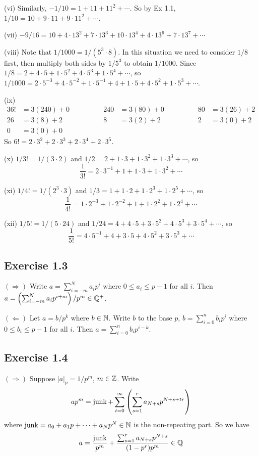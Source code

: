 \documentclass[../Koblitz.tex]{subfiles}
\begin{document}
(vi) Similarly, $-1/10=1+11+11^2+\cdots$. So by Ex 1.1, $1/10=10+9\cdot11+9\cdot11^2+\cdots$.

(vii) $-9/16=10+4\cdot13^2+7\cdot13^3+10\cdot13^4+4\cdot13^6+7\cdot13^7+\cdots$

(viii) Note that $1/1000=1/(5^3\cdot8)$. In this situation we need to consider $1/8$ first, then multiply both sides by $1/5^3$ to obtain $1/1000$. Since $1/8=2+4\cdot5+1\cdot5^2+4\cdot5^3+1\cdot5^4+\cdots$, so $1/1000=2\cdot5^{-3}+4\cdot5^{-2}+1\cdot5^{-1}+4+1\cdot5+4\cdot5^2+1\cdot5^3+\cdots$.

(ix) \begin{alignat*}{3}
6!&=3(240)+0 &\qquad\qquad 240&=3(80)+0 &\qquad\qquad 80&=3(26)+2 \\
26&=3(8)+2 &\qquad \qquad 8&=3(2)+2 &\qquad\qquad 2&=3(0)+2 \\
0&=3(0)+0
\end{alignat*}
So $6!=2\cdot3^2+2\cdot3^3+2\cdot3^4+2\cdot3^5$.

(x) $1/3!=1/(3\cdot2)$ and $1/2=2+1\cdot3+1\cdot3^2+1\cdot3^3+\cdots$, so $$\frac{1}{3!}=2\cdot3^{-1}+1+1\cdot3+1\cdot3^2+\cdots$$

(xi) $1/4!=1/(2^3\cdot3)$ and $1/3=1+1\cdot2+1\cdot2^3+1\cdot2^5+\cdots$, so $$\frac{1}{4!}=1\cdot2^{-3}+1\cdot2^{-2}+1+1\cdot2^2+1\cdot2^4+\cdots$$

(xii) $1/5!=1/(5\cdot24)$ and $1/24=4+4\cdot5+3\cdot5^2+4\cdot5^3+3\cdot5^4+\cdots$, so $$\frac{1}{5!}=4\cdot5^{-1}+4+3\cdot5+4\cdot5^2+3\cdot5^3+\cdots$$

\subsection*{Exercise 1.3}

$(\Rightarrow)$ Write $a=\sum_{i=-m}^N a_ip^i$ where $0\leq a_i\leq p-1$ for all $i$. Then $a=\left(\sum_{i=-m}^N a_ip^{i+m}\right)/p^m\in\mathbb{Q}^+$.

$(\Leftarrow)$ Let $a=b/p^k$ where $b\in\mathbb{N}$. Write $b$ to the base $p$, $b=\sum_{i=0}^n b_ip^i$ where $0\leq b_i\leq p-1$ for all $i$. Then $a=\sum_{i=0}^n b_ip^{i-k}$.

\subsection*{Exercise 1.4}

$(\Rightarrow)$ Suppose $|a|_p=1/p^m$, $m\in\mathbb{Z}$. Write $$ap^m=\operatorname{junk}+\sum_{t=0}^\infty \left(\sum_{s=1}^r a_{N+s}p^{N+s+tr}\right)$$ where $\operatorname{junk}=a_0+a_1p+\cdots+a_Np^N\in\mathbb{N}$ is the non-repeating part. So we have $$a = \frac{\operatorname{junk}}{p^m}+\frac{\sum_{s=1}^r a_{N+s}p^{N+s}}{(1-p^r)p^m}\in\mathbb{Q}$$
\end{document}
